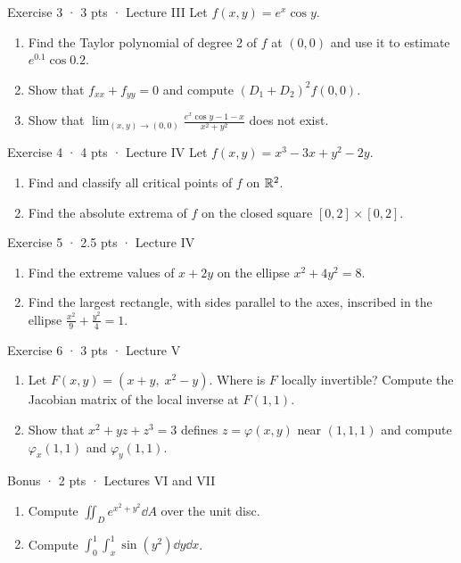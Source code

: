 \begin{problem}{Exercise 3 · 3 pts · Lecture III}
Let $f(x,y)=e^x\cos y$.
\begin{enumerate}[label=(\alph*)]
  \item Find the Taylor polynomial of degree 2 of $f$ at $(0,0)$ and use it to estimate $e^{0.1}\cos0.2$.
  \item Show that $f_{xx}+f_{yy}=0$ and compute $(D_1+D_2)^2f(0,0)$.
  \item Show that $\displaystyle\lim_{(x,y)\to(0,0)}\frac{e^x\cos y-1-x}{x^2+y^2}$ does not exist.
\end{enumerate}
\end{problem}

\begin{problem}{Exercise 4 · 4 pts · Lecture IV}
Let $f(x,y)=x^3-3x+y^2-2y$.
\begin{enumerate}[label=(\alph*)]
  \item Find and classify all critical points of $f$ on $\mathbb{R}^2$.
  \item Find the absolute extrema of $f$ on the closed square $[0,2]\times[0,2]$.
\end{enumerate}
\end{problem}

\begin{problem}{Exercise 5 · 2.5 pts · Lecture IV}
\begin{enumerate}[label=(\alph*)]
  \item Find the extreme values of $x+2y$ on the ellipse $x^2+4y^2=8$.
  \item Find the largest rectangle, with sides parallel to the axes, inscribed in the ellipse
  $\frac{x^2}9+\frac{y^2}4=1$.
\end{enumerate}
\end{problem}

\begin{problem}{Exercise 6 · 3 pts · Lecture V}
\begin{enumerate}[label=(\alph*)]
  \item Let $F(x,y)=(x+y,\;x^2-y)$. Where is $F$ locally invertible? Compute the Jacobian matrix of
  the local inverse at $F(1,1)$.
  \item Show that $x^2+yz+z^3=3$ defines $z=\varphi(x,y)$ near $(1,1,1)$ and compute
  $\varphi_x(1,1)$ and $\varphi_y(1,1)$.
\end{enumerate}
\end{problem}

\begin{problem}{Bonus · 2 pts · Lectures VI and VII}
\begin{enumerate}[label=(\alph*)]
  \item Compute $\iint_De^{x^2+y^2}\dd A$ over the unit disc.
  \item Compute $\int_0^1\!\int_x^1\sin(y^2)\dd y\dd x$.
\end{enumerate}
\end{problem}

